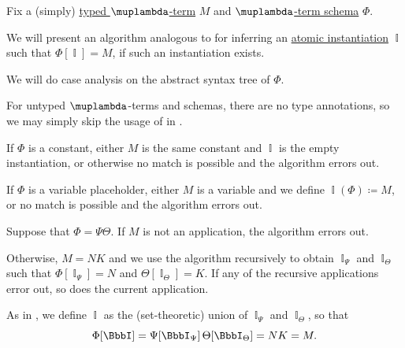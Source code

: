 \begin{algorithm}\label{alg:lambda_term_schema_inference}
  Fix a (simply) \hyperref[def:typed_lambda_term]{typed \( \muplambda \)-term} \( M \) and \hyperref[def:lambda_term_schema]{\( \muplambda \)-term schema} \( \Phi \).

  We will present an algorithm analogous to  for inferring an \hyperref[def:atomic_lambda_instantiation]{atomic instantiation} \( \BbbI \) such that \( \Phi[\BbbI] = M \), if such an instantiation exists.

  We will do case analysis on the abstract syntax tree of \( \Phi \).

  For untyped \( \muplambda \)-terms and schemas, there are no type annotations, so we may simply skip the usage of  in .

  \begin{thmenum}
     If \( \Phi \) is a constant, either \( M \) is the same constant and \( \BbbI \) is the empty instantiation, or otherwise no match is possible and the algorithm errors out.

     If \( \Phi \) is a variable placeholder, either \( M \) is a variable and we define \( \BbbI(\Phi) \coloneqq M \), or no match is possible and the algorithm errors out.

     Suppose that \( \Phi = \Psi \Theta \). If \( M \) is not an application, the algorithm errors out.

    Otherwise, \( M = NK \) and we use the algorithm recursively to obtain \( \BbbI_\Psi \) and \( \BbbI_\Theta \) such that \( \Phi[\BbbI_\Psi] = N \) and \( \Theta[\BbbI_\Theta] = K \). If any of the recursive applications error out, so does the current application.

    As in , we define \( \BbbI \) as the (set-theoretic) union of \( \BbbI_\Psi \) and \( \BbbI_\Theta \), so that
    \begin{equation*}
      \Phi[\BbbI] = \Psi[\BbbI_\Psi] \thinspace \Theta[\BbbI_\Theta] = N K = M.
    \end{equation*}


\end{thmenum}
\end{algorithm}
